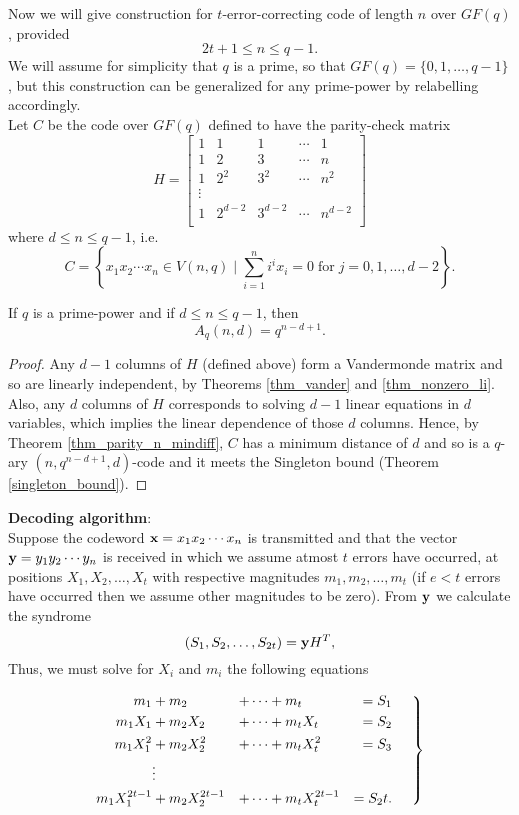 \documentclass[../main.tex]{subfiles}
\begin{document}
Now we will give construction for $t$-error-correcting code of length $n$ over $GF(q)$, provided 
\[
	2t+1\leq n \leq q-1.
\]
We will assume for simplicity that $q$ is a prime, so that $GF(q)=\{0,1,\ldots,q-1\}$, but this construction can be generalized for any prime-power by relabelling accordingly.\\
Let $C$ be the code over $GF(q)$ defined to have the parity-check matrix
\[
	H=
	\begin{bmatrix}
		1 & 1 & 1 & \cdots & 1 \\
		1 & 2 & 3 & \cdots & n \\
		1 & 2^2 & 3^2 & \cdots & n^2 \\
		\vdots \\
		1 & 2^{d-2} & 3^{d-2} & \cdots & n^{d-2} \\
	\end{bmatrix}
\]
where $d\leq n\leq q-1$, i.e.
\[
	C = \left\{
		x_1x_2\cdots x_n \in V(n,q)\; |\; \sum_{i=1}^n i^ix_i = 0\;\text{for}\;j=0,1,\ldots,d-2
		\right\}.
\]

\begin{thm}
	If $q$ is a prime-power and if $d\leq n\leq q-1$, then 
	\[
		A_q(n,d) = q^{n-d+1}.
	\]
\end{thm}
\begin{proof}
	Any $d-1$ columns of $H$ (defined above) form a Vandermonde matrix and so are linearly independent, by Theorems \ref{thm_vander} and \ref{thm_nonzero_li}. Also, any $d$ columns of $H$ corresponds to solving $d-1$ linear equations in $d$ variables, which implies the linear dependence of those $d$ columns. Hence, by Theorem \ref{thm_parity_n_mindiff}, $C$ has a minimum distance of $d$ and so is a $q$-ary $(n,q^{n-d+1},d)$-code and it meets the Singleton bound (Theorem \ref{singleton_bound}). 
\end{proof}

\textbf{Decoding algorithm}:\\
Suppose the codeword $\textbf{x}=x_1x_2\cdots x_n$ is transmitted and that the vector $\textbf{y}=y_1y_2\cdots y_n$ is received in which we assume atmost $t$ errors have occurred, at positions $X_1,X_2,\ldots,X_t$ with respective magnitudes $m_1,m_2,\ldots,m_t$ (if $e<t$ errors have occurred then we assume other magnitudes to be zero). From $\textbf{y}$ we calculate the syndrome
\[
	(S_1,S_2,\ldots,S_{2t}) = \textbf{y}H^T,
\]
Thus, we must solve for $X_i$ and $m_i$ the following equations

\begin{equation}\label{oc_eqs}
	\left.
	\begin{split}
		m_1 & + m_2 & + \cdots & + m_t & = S_1 \\
 		m_1X_1 & + m_2X_2 & + \cdots & + m_tX_t & = S_2 \\
 		m_1X_1^{2} & + m_2X_2^{2} & + \cdots & + m_tX_t^{2} & = S_3\\
 		    & \vdots & \\
 		m_1X_1^{2t-1} & + m_2X_2^{2t-1} & + \cdots & + m_tX_t^{2t-1} & = S_2t. \\
	\end{split}
	\hspace{5mm}
	\right\}
\end{equation}
\end{document}
